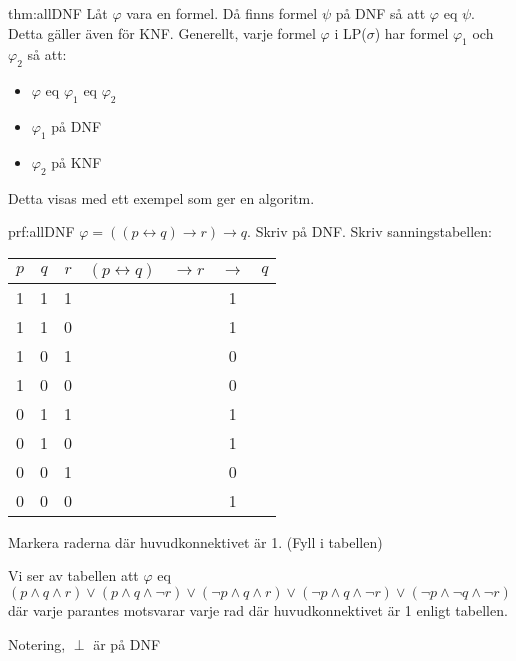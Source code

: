 \begin{theo}{thm:allDNF}
  Låt $\varphi$ vara en formel. Då finns formel $\psi$ på DNF så att $\varphi$ eq $\psi$. Detta gäller även för KNF. Generellt, varje formel $\varphi$ i LP($\sigma$) har formel $\varphi_1$ och $\varphi_2$ så att:\par
  \begin{itemize}
    \item $\varphi$ eq $\varphi_1$ eq $\varphi_2$
    \item $\varphi_1$ på DNF
    \item $\varphi_2$ på KNF
  \end{itemize}
\end{theo}
\par\bigskip
\noindent Detta visas med ett exempel som ger en algoritm.
\par\bigskip
\begin{prf}{prf:allDNF}
  $\varphi=((p\leftrightarrow q)\rightarrow r)\rightarrow q$. Skriv på DNF. Skriv sanningstabellen:
  \par\bigskip

  \begin{center}
    \begin{tabular}{|c|c|c|c|c|c|c|}
      \hline
      $p$&$q$&$r$&$(p\leftrightarrow q)$&$\rightarrow r$&$\rightarrow$&$q$\\
      \hline
      1&1&1&&&1&\\
      \hline
      1&1&0&&&1&\\
      \hline
      1&0&1&&&0&\\
      \hline
      1&0&0&&&0&\\
      \hline
      0&1&1&&&1&\\
      \hline
      0&1&0&&&1&\\
      \hline
      0&0&1&&&0&\\
      \hline
      0&0&0&&&1&\\
      \hline

    \end{tabular}
  \end{center}
  \par\bigskip
  \noindent Markera raderna där huvudkonnektivet är 1. (Fyll i tabellen)
  \par\bigskip
  \noindent Vi ser av tabellen att $\varphi$ eq $(p\wedge q\wedge r)\vee(p\wedge q \wedge\neg r)\vee(\neg p\wedge q\wedge r)\vee(\neg p\wedge q\wedge\neg r)\vee(\neg p\wedge\neg q\wedge\neg r)$ där varje parantes motsvarar varje rad där huvudkonnektivet är 1 enligt tabellen.
  \par\bigskip
  \noindent Notering, $\perp$ är på DNF
\end{prf}
